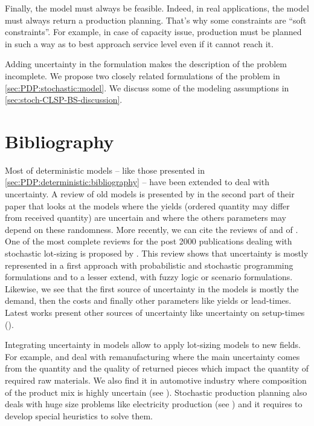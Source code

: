 Finally, the model must always be feasible.
Indeed, in real applications, the model must always return a production planning.
That's why some constraints are ``soft constraints''.
For example, in case of capacity issue, production must be planned in such a way as to best approach service level even if it cannot reach it.


Adding uncertainty in the formulation makes the description of the problem incomplete.
We propose two closely related formulations of the problem in \cref{sec:PDP:stochastic:model}.
We discuss some of the modeling assumptions in \cref{sec:stoch-CLSP-BS-discussion}.


\section{Bibliography}
\label{sec:PDP:stochastic:bibliography}


Most of deterministic models -- like those presented in \cref{sec:PDP:deterministic:bibliography} -- have been extended to deal with uncertainty.
A review of old models is presented by \citet{Candace1995} in the second part of their paper that looks at the models where the yields (\eg ordered quantity may differ from received quantity) are uncertain and where the others parameters may depend on these randomness.
More recently, we can cite the reviews of \citet{Mula2006} and of \citet{Diaz-Madronero2014}.
One of the most complete reviews for the post 2000 publications dealing with stochastic lot-sizing is proposed by \citet{Aloulou2014}.
This review shows that uncertainty is mostly represented in a first approach with probabilistic and stochastic programming formulations and to a lesser extend, with fuzzy logic or scenario formulations.
Likewise, we see that the first source of uncertainty in the models is mostly the demand, then the costs and finally other parameters like yields or lead-times.
Latest works present other sources of uncertainty like uncertainty on setup-times (\citet{Tas2018}).


Integrating uncertainty in models allow to apply lot-sizing models to new fields.
For example, \citet{Mukhopadhyay2009} and \citet{Macedo2016} deal with remanufacturing where the main uncertainty comes from the quantity and the quality of returned pieces which impact the quantity of required raw materials.
We also find it in automotive industry where composition of the product mix is highly uncertain (see \citet{Gyulai2015}).
Stochastic production planning also deals with huge size problems like electricity production (see \citet{Rozenknop2013}) and it requires to develop special heuristics to solve them.



